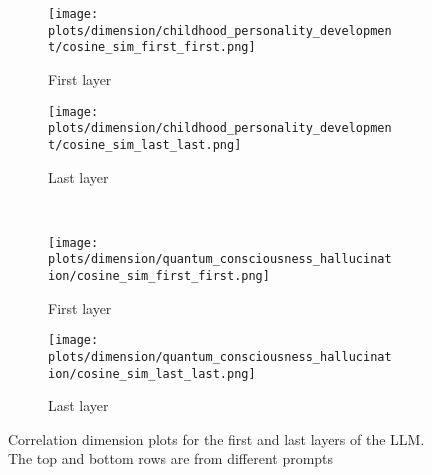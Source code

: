 \documentclass[a4paper,12pt]{article}
\begin{document}
\begin{figure}[H]
    \centering
    \begin{subfigure}[b]{0.48\linewidth}
        \centering
        \texttt{[image: plots/dimension/childhood\_personality\_development/cosine\_sim\_first\_first.png]}
        \caption{First layer}
    \end{subfigure}\hfill
    \begin{subfigure}[b]{0.48\linewidth}
        \centering
        \texttt{[image: plots/dimension/childhood\_personality\_development/cosine\_sim\_last\_last.png]}
        \caption{Last layer}
    \end{subfigure}
    \\[0.5em]
    \centering
    \begin{subfigure}[b]{0.48\linewidth}
        \centering
        \texttt{[image: plots/dimension/quantum\_consciousness\_hallucination/cosine\_sim\_first\_first.png]}
        \caption{First layer}
    \end{subfigure}\hfill
    \begin{subfigure}[b]{0.48\linewidth}
        \centering
        \texttt{[image: plots/dimension/quantum\_consciousness\_hallucination/cosine\_sim\_last\_last.png]}
        \caption{Last layer}
    \end{subfigure}
    \caption{Correlation dimension plots for the first and last layers of the LLM. The top and bottom rows are from different prompts}
    \label{fig:dim_first_last}
\end{figure}

\end{document}

